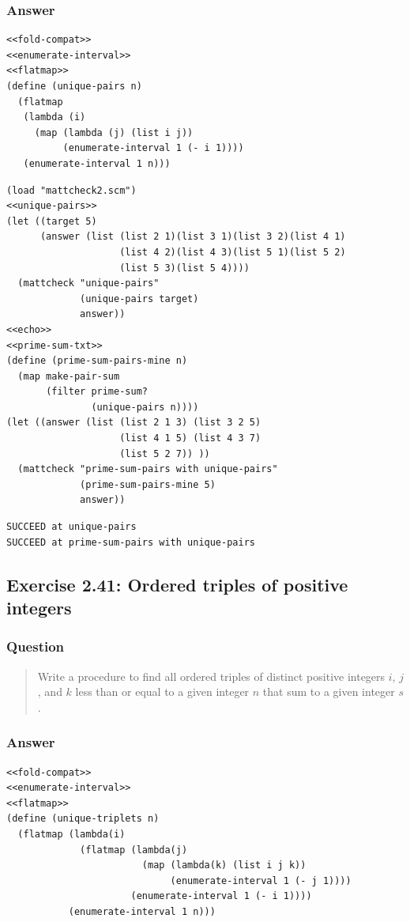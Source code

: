 \documentclass[final,fleqn,titlepage,twoside]{article}
\begin{document}
\subsubsection{Answer}
\label{sec:org710cf95}
\begin{verbatim}
<<fold-compat>>
<<enumerate-interval>>
<<flatmap>>
(define (unique-pairs n)
  (flatmap
   (lambda (i)
     (map (lambda (j) (list i j))
          (enumerate-interval 1 (- i 1))))
   (enumerate-interval 1 n)))
\end{verbatim}
\begin{verbatim}
(load "mattcheck2.scm")
<<unique-pairs>>
(let ((target 5)
      (answer (list (list 2 1)(list 3 1)(list 3 2)(list 4 1)
                    (list 4 2)(list 4 3)(list 5 1)(list 5 2)
                    (list 5 3)(list 5 4))))
  (mattcheck "unique-pairs"
             (unique-pairs target)
             answer))
<<echo>>
<<prime-sum-txt>>
(define (prime-sum-pairs-mine n)
  (map make-pair-sum
       (filter prime-sum?
               (unique-pairs n))))
(let ((answer (list (list 2 1 3) (list 3 2 5)
                    (list 4 1 5) (list 4 3 7)
                    (list 5 2 7)) ))
  (mattcheck "prime-sum-pairs with unique-pairs"
             (prime-sum-pairs-mine 5)
             answer))
\end{verbatim}

\begin{verbatim}
SUCCEED at unique-pairs
SUCCEED at prime-sum-pairs with unique-pairs
\end{verbatim}

\subsection{Exercise 2.41: Ordered triples of positive integers}
\label{sec:orga807a89}
\subsubsection{Question}
\label{sec:org185dfab}
\begin{quote}
Write a procedure to find all ordered triples of distinct positive integers
\(i\), \(j\), and \(k\) less than or equal to a given integer \(n\) that sum to
a given integer \(s\).
\end{quote}

\subsubsection{Answer}
\label{sec:org9df28f1}
\begin{verbatim}
<<fold-compat>>
<<enumerate-interval>>
<<flatmap>>
(define (unique-triplets n)
  (flatmap (lambda(i)
             (flatmap (lambda(j)
                        (map (lambda(k) (list i j k))
                             (enumerate-interval 1 (- j 1))))
                      (enumerate-interval 1 (- i 1))))
           (enumerate-interval 1 n)))
\end{verbatim}
\end{document}
